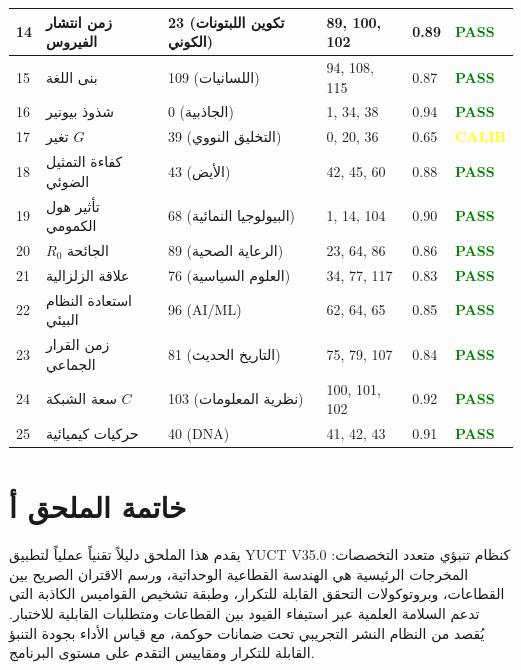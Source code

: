 \documentclass[13pt,a4paper]{article}
\begin{document}
\begin{longtable}{|p{0.8cm}|p{2.5cm}|p{1.8cm}|p{1.5cm}|p{1.5cm}|p{1.8cm}|}
		\hline
		14 & زمن انتشار الفيروس & 23 (تكوين اللبتونات الكوني) & 89, 100, 102 & 0.89 & \textcolor{green}{\textbf{PASS}} \\
		\hline
		15 & بنى اللغة & 109 (اللسانيات) & 94, 108, 115 & 0.87 & \textcolor{green}{\textbf{PASS}} \\
		\hline
		16 & شذوذ بيونير & 0 (الجاذبية) & 1, 34, 38 & 0.94 & \textcolor{green}{\textbf{PASS}} \\
		\hline
		17 & تغير $G$ & 39 (التخليق النووي) & 0, 20, 36 & 0.65 & \textcolor{yellow}{\textbf{CALIB}} \\
		\hline
		18 & كفاءة التمثيل الضوئي & 43 (الأيض) & 42, 45, 60 & 0.88 & \textcolor{green}{\textbf{PASS}} \\
		\hline
		19 & تأثير هول الكمومي & 68 (البيولوجيا النمائية) & 1, 14, 104 & 0.90 & \textcolor{green}{\textbf{PASS}} \\
		\hline
		20 & $R_0$ الجائحة & 89 (الرعاية الصحية) & 23, 64, 86 & 0.86 & \textcolor{green}{\textbf{PASS}} \\
		\hline
		21 & علاقة الزلزالية & 76 (العلوم السياسية) & 34, 77, 117 & 0.83 & \textcolor{green}{\textbf{PASS}} \\
		\hline
		22 & استعادة النظام البيئي & 96 (AI/ML) & 62, 64, 65 & 0.85 & \textcolor{green}{\textbf{PASS}} \\
		\hline
		23 & زمن القرار الجماعي & 81 (التاريخ الحديث) & 75, 79, 107 & 0.84 & \textcolor{green}{\textbf{PASS}} \\
		\hline
		24 & سعة الشبكة $C$ & 103 (نظرية المعلومات) & 100, 101, 102 & 0.92 & \textcolor{green}{\textbf{PASS}} \\
		\hline
		25 & حركيات كيميائية & 40 (DNA) & 41, 42, 43 & 0.91 & \textcolor{green}{\textbf{PASS}} \\
		\hline
	\end{longtable}
	
	
	\section*{خاتمة الملحق أ}
	
	يقدم هذا الملحق دليلاً تقنياً عملياً لتطبيق YUCT V35.0 كنظام تنبؤي متعدد التخصصات: المخرجات الرئيسية هي الهندسة القطاعية الوحداتية، ورسم الاقتران الصريح بين القطاعات، وبروتوكولات التحقق القابلة للتكرار، وطبقة تشخيص القواميس الكاذبة التي تدعم السلامة العلمية عبر استيفاء القيود بين القطاعات ومتطلبات القابلية للاختبار. يُقصد من النظام النشر التجريبي تحت ضمانات حوكمة، مع قياس الأداء بجودة التنبؤ القابلة للتكرار ومقاييس التقدم على مستوى البرنامج.
	
\end{document}
